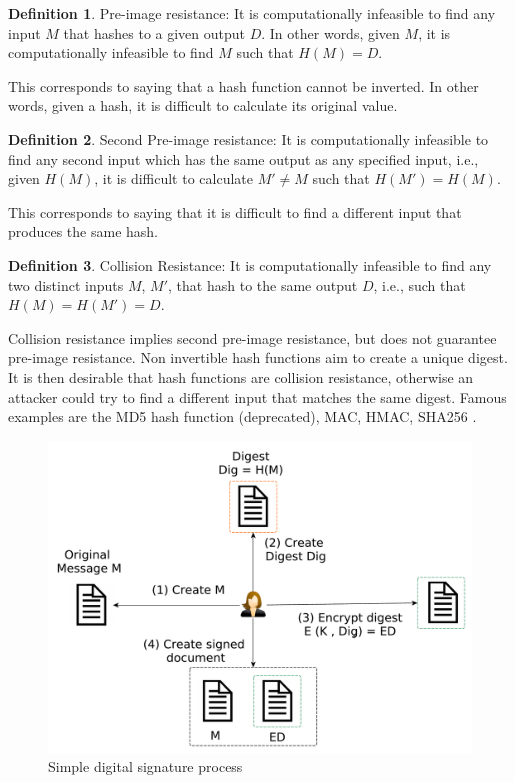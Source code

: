 \documentclass[12pt,a4paper]{article}
\theoremstyle{definition}
\newtheorem{definition}{Definition}[section]
\begin{document}
\theoremstyle{definition}
\begin{definition}{Pre-image resistance:}
It is computationally infeasible to find any input $M$ that hashes to a given output $D$. In other words, given $M$, it is computationally infeasible to find $M$ such that $H(M) = D$.

\end{definition}


This corresponds to saying that a hash function cannot be inverted. In other words, given a hash, it is difficult to calculate its original value.


\theoremstyle{definition}
\begin{definition}{Second Pre-image resistance:}
It is computationally infeasible to find any second input which has the same output as any specified input, i.e., given $H(M)$, it is difficult to calculate $M' \neq M$ such that $H(M') = H(M)$.

\end{definition}

 
This corresponds to saying that it is difficult to find a different input that produces the same hash. 

\theoremstyle{definition}
\begin{definition}{Collision Resistance:}
It is computationally infeasible to find any two distinct inputs $M$, $M'$, that hash to the same output $D$, i.e., such that $H(M) = H(M') = D$.
 

\end{definition}

Collision resistance implies second pre-image resistance, but does not guarantee pre-image resistance. Non invertible hash functions aim to create a unique digest. It is then desirable that hash functions are collision resistance, otherwise an attacker could try to find a different input that matches the same digest. Famous examples are the MD5 hash function (deprecated), MAC, HMAC, SHA256 \cite{conrad2016}. 


\begin{figure}[h]
    \centering
    \includegraphics[scale=0.4]{figures/digital_signature_create.pdf}
    \caption{Simple digital signature process}
    \label{fig:ds_create}
\end{figure}
\end{document}
